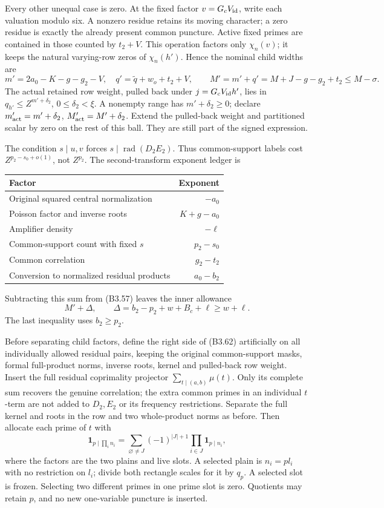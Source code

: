 \documentclass[11pt,a4paper]{article}
\begin{document}
Every other unequal case is zero. At the fixed factor
\(v=G_cV_{\rm id}\), write each valuation modulo six. A nonzero residue
retains its moving character; a zero residue is exactly the already
present common puncture. Active fixed primes are contained in those
counted by \(t_2+V\). This operation factors only \(\chi_n(v)\); it
keeps the natural varying-row zeros of \(\chi_n(h')\). Hence the nominal
child widths are \[
m'=2a_0-K-g-g_2-V,\quad q'=\widetilde q+w_o+t_2+V,
\qquad M'=m'+q'=M+J-g-g_2+t_2\le M-\sigma.
\tag{B3.63}
\] The actual retained row weight, pulled back under
\(j=G_cV_{\rm id}h'\), lies in \(q_{h'}\le Z^{m'+\delta_2}\),
\(0\le\delta_2<\xi\). A nonempty range has \(m'+\delta_2\ge0\); declare
\(m'_{\rm act}=m'+\delta_2\), \(M'_{\rm act}=M'+\delta_2\). Extend the
pulled-back weight and partitioned scalar by zero on the rest of this
ball. They are still part of the signed expression.

The condition \(s\mid u,\allowbreak{}v\) forces \(s\mid\operatorname{rad}(D_2E_2)\).
Thus common-support labels cost \(Z^{p_2-s_0+o(1)}\), not \(Z^{p_2}\).
The second-transform exponent ledger is

\begin{longtable}[]{@{}lr@{}}
\toprule\noalign{}
Factor & Exponent \\
\midrule\noalign{}
\endhead
\bottomrule\noalign{}
\endlastfoot
Original squared central normalization & \(-a_0\) \\
Poisson factor and inverse roots & \(K+g-a_0\) \\
Amplifier density & \(-\ell\) \\
Common-support count with fixed \(s\) & \(p_2-s_0\) \\
Common correlation & \(g_2-t_2\) \\
Conversion to normalized residual products & \(a_0-b_2\) \\
\end{longtable}

Subtracting this sum from (B3.57) leaves the inner allowance \[
M'+\Delta,\qquad \Delta=b_2-p_2+w+B_c+\ell\ge w+\ell.
\tag{B3.64}
\] The last inequality uses \(b_2\ge p_2\).

Before separating child factors, define the right side of (B3.62)
artificially on all individually allowed residual pairs, keeping the
original common-support masks, formal full-product norms, inverse roots,
kernel and pulled-back row weight. Insert the full residual coprimality
projector \(\sum_{t\mid(a,\allowbreak{}b)}\mu(t)\). Only its complete sum recovers
the genuine correlation; the extra common primes in an individual
\(t\)-term are not added to \(D_2,\allowbreak{}E_2\) or its frequency restrictions.
Separate the full kernel and roots in the row and two whole-product
norms as before. Then allocate each prime of \(t\) with \[
\mathbf1_{p\mid\prod_i n_i}
=\sum_{\varnothing\ne J}(-1)^{|J|+1}\prod_{i\in J}\mathbf1_{p\mid n_i},
\tag{B3.65}
\] where the factors are the two plains and live slots. A selected plain
is \(n_i=pl_i\) with no restriction on \(l_i\); divide both rectangle
scales for it by \(q_p\). A selected slot is frozen. Selecting two
different primes in one prime slot is zero. Quotients may retain \(p\),
and no new one-variable puncture is inserted.
\end{document}
